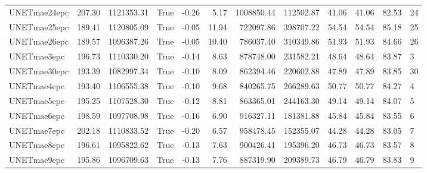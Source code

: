 \begin{tabular}{lrrlrrrrrrrl}
UNETmae24epc & 207.30 & 1121353.31 & True & -0.26 & 5.17 & 1008850.44 & 112502.87 & 41.06 & 41.06 & 82.53 & 24 \\
UNETmae25epc & 189.41 & 1120805.09 & True & -0.05 & 11.94 & 722097.86 & 398707.22 & 54.54 & 54.54 & 85.18 & 25 \\
UNETmae26epc & 189.57 & 1096387.26 & True & -0.05 & 10.40 & 786037.40 & 310349.86 & 51.93 & 51.93 & 84.66 & 26 \\
UNETmae3epc & 196.73 & 1110330.20 & True & -0.14 & 8.63 & 878748.00 & 231582.21 & 48.64 & 48.64 & 83.87 & 3 \\
UNETmae30epc & 193.39 & 1082997.34 & True & -0.10 & 8.09 & 862394.46 & 220602.88 & 47.89 & 47.89 & 83.85 & 30 \\
UNETmae4epc & 193.40 & 1106555.38 & True & -0.10 & 9.68 & 840265.75 & 266289.63 & 50.77 & 50.77 & 84.27 & 4 \\
UNETmae5epc & 195.25 & 1107528.30 & True & -0.12 & 8.81 & 863365.01 & 244163.30 & 49.14 & 49.14 & 84.07 & 5 \\
UNETmae6epc & 198.59 & 1097708.98 & True & -0.16 & 6.90 & 916327.11 & 181381.88 & 45.84 & 45.84 & 83.55 & 6 \\
UNETmae7epc & 202.18 & 1110833.52 & True & -0.20 & 6.57 & 958478.45 & 152355.07 & 44.28 & 44.28 & 83.05 & 7 \\
UNETmae8epc & 196.61 & 1095822.62 & True & -0.13 & 7.63 & 900426.41 & 195396.20 & 46.73 & 46.73 & 83.57 & 8 \\
UNETmae9epc & 195.86 & 1096709.63 & True & -0.13 & 7.76 & 887319.90 & 209389.73 & 46.79 & 46.79 & 83.83 & 9 \\
\bottomrule
\end{tabular}
